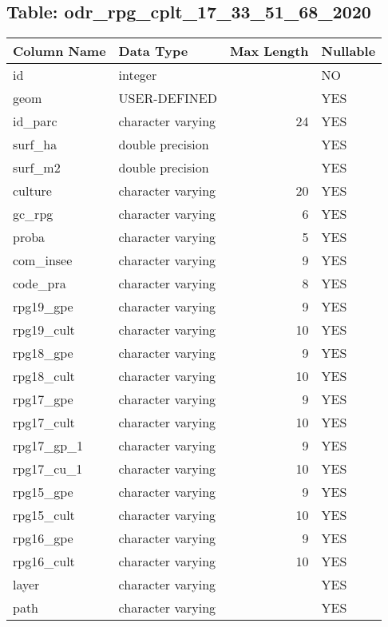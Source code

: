 \subsection*{Table: odr_rpg_cplt_17_33_51_68_2020}
\begin{tabular}{llrl}
\hline
 Column Name   & Data Type         &   Max Length & Nullable   \\
\hline
 id            & integer           &              & NO         \\
 geom          & USER-DEFINED      &              & YES        \\
 id_parc       & character varying &           24 & YES        \\
 surf_ha       & double precision  &              & YES        \\
 surf_m2       & double precision  &              & YES        \\
 culture       & character varying &           20 & YES        \\
 gc_rpg        & character varying &            6 & YES        \\
 proba         & character varying &            5 & YES        \\
 com_insee     & character varying &            9 & YES        \\
 code_pra      & character varying &            8 & YES        \\
 rpg19_gpe     & character varying &            9 & YES        \\
 rpg19_cult    & character varying &           10 & YES        \\
 rpg18_gpe     & character varying &            9 & YES        \\
 rpg18_cult    & character varying &           10 & YES        \\
 rpg17_gpe     & character varying &            9 & YES        \\
 rpg17_cult    & character varying &           10 & YES        \\
 rpg17_gp_1    & character varying &            9 & YES        \\
 rpg17_cu_1    & character varying &           10 & YES        \\
 rpg15_gpe     & character varying &            9 & YES        \\
 rpg15_cult    & character varying &           10 & YES        \\
 rpg16_gpe     & character varying &            9 & YES        \\
 rpg16_cult    & character varying &           10 & YES        \\
 layer         & character varying &              & YES        \\
 path          & character varying &              & YES        \\
\hline
\end{tabular}
